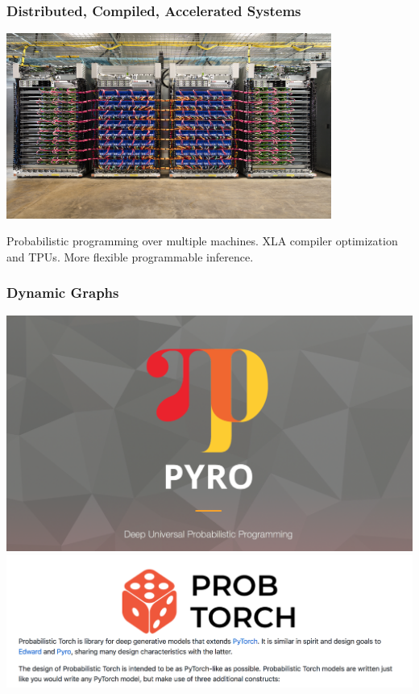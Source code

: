 \documentclass[10pt,
               xcolor={usenames,dvipsnames},
               hyperref={colorlinks,linktoc=all,citecolor=Plum,linkcolor=MidnightBlue,urlcolor=MidnightBlue},noamssymb]{beamer}
\begin{document}
\begin{frame}
\frametitle{Distributed, Compiled, Accelerated Systems}
\begin{center}
\vspace{-1.25ex}
\includegraphics[width=0.8\textwidth]{img/tpu-pods.png}
\end{center}

\vspace{3ex}
Probabilistic programming over multiple machines.
XLA compiler optimization and TPUs.
More flexible programmable inference.
\end{frame}

\begin{frame}[t]
\frametitle{Dynamic Graphs}
\begin{center}
\vspace{-1.25ex}
\includegraphics[width=1.0\textwidth]{img/pyro.png}
\\[-8.75ex]
\includegraphics[width=1.0\textwidth]{img/probtorch.png}
\end{center}
\end{frame}
\end{document}
